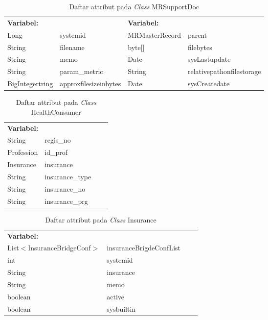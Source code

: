 \begin{table}[H]
	\caption{Daftar attribut pada \textit{Class} MRSupportDoc}
	\centering
	\small
	\begin{adjustbox}{width=1\textwidth}	
		\begin{tabular}{|p{2.2cm} p{3.1cm} p{3cm} p{3.9cm}|}
			\hline
			\multicolumn{2}{|l}{\textbf{Variabel:}}&\multicolumn{2}{l|}{\textbf{\textbf{Variabel:}}}\\
			Long&systemid&MRMasterRecord&parent\\
			String&filename&byte[]&filebytes\\
			String&memo&Date&sysLastupdate\\
			String&param\_metric&String&relativepathonfilestorage\\
			BigIntegertring&approxfilesizeinbytes&Date&sysCreatedate\\
			\hline
		\end{tabular}
	\end{adjustbox}
\end{table}
\begin{table}[H]
	\caption{Daftar attribut pada \textit{Class} HealthConsumer}
	\centering
	\small
	\begin{adjustbox}{width=1\textwidth}	
		\begin{tabular}{|p{4cm} p{2.1cm} p{3cm} p{3.1cm}|}
			\hline
			\multicolumn{2}{|l}{\textbf{Variabel:}}&\multicolumn{2}{l|}{\textbf{}}\\
			String&regis\_no&&\\
			Profession&id\_prof&&\\
			Insurance&insurance&&\\
			String&insurance\_type&&\\
			String&insurance\_no&&\\
			String&insurance\_prg&&\\
			\hline
		\end{tabular}
	\end{adjustbox}
\end{table}
\begin{table}[H]
	\caption{Daftar attribut pada \textit{Class} Insurance}
	\centering
	\small
	\begin{adjustbox}{width=1\textwidth}	
		\begin{tabular}{|p{5cm} p{3.1cm} p{2cm} p{2.1cm}|}
			\hline
			\multicolumn{2}{|l}{\textbf{Variabel:}}&\multicolumn{2}{l|}{\textbf{}}\\
			List$<$InsuranceBridgeConf$>$&insuranceBrigdeConfList&&\\
			int&systemid&&\\
			String&insurance&&\\
			String&memo&&\\
			boolean&active&&\\
			boolean&sysbuiltin&&\\
			\hline
		\end{tabular}
	\end{adjustbox}
\end{table}
